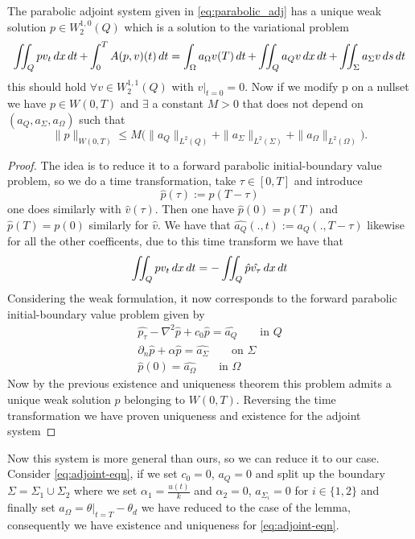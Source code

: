 \begin{lemma}
The parabolic adjoint system given in \eqref{eq:parabolic_adj} has a unique weak solution $p \in W_2^{1,0}(Q)$ which is a solution to the variational problem 
\begin{equation*}
    \iint_Q pv_t \mathop{dx}\mathop{dt} + \int_0^TA(p,v)(t)\mathop{dt} = \int_{\Omega}a_{\Omega}v(T) \mathop{dt} + \iint_Q a_Qv \mathop{dx}\mathop{dt} + \iint_{\Sigma}a_{\Sigma}v \mathop{ds}\mathop{dt}
\end{equation*}
this should hold $\forall v \in W_2^{1,1}(Q)$ with $v|_{t=0} = 0$. Now if we modify p on a nullset we have $p\in W(0,T)$ and $\exists$ a constant $M>0$ that does not depend on $(a_Q,a_{\Sigma}, a_{\Omega})$ such that 
\begin{equation*}
    \|p\|_{W(0,T)} \leq M \bigg (\|a_Q\|_{L^2(Q)} + \|a_{\Sigma}\|_{L^2(\Sigma)} + \|a_{\Omega}\|_{L^2(\Omega)} \bigg ).
\end{equation*}
\end{lemma}

\begin{proof}
The idea is to reduce it to a forward parabolic initial-boundary value problem, so we do a time transformation, take $\tau \in [0,T]$ and introduce 
\begin{equation*}
    \hat{p}(\tau) := p(T-\tau)
\end{equation*}
one does similarly with $\hat{v}(\tau)$. Then one have $\hat{p}(0) = p(T)$ and $\hat{p}(T) = p(0)$ similarly for $\hat{v}$. We have that $\hat{a_Q}(.,t):= a_Q(.,T-\tau)$ likewise for all the other coefficents, due to this time transform we have that
\begin{equation*}
    \iint_Qpv_t \mathop{dx}\mathop{dt} = - \iint_Q \hat{p}\hat{v_{\tau}} \mathop{dx}\mathop{dt}
\end{equation*}
Considering the weak formulation, it now corresponds to the forward parabolic initial-boundary value problem given by 
\begin{align*}
    \hat{p_{\tau}} - \nabla^2 \hat{p} + c_0 \hat{p} = \hat{a_Q} \qquad \text{in } Q \\
    \partial_n \hat{p} + \alpha \hat{p} = \hat{a_{\Sigma}} \qquad \text{on } \Sigma \\
    \hat{p}(0) = \hat{a_{\Omega}} \qquad \text{in } \Omega
\end{align*}
Now by the previous existence and uniqueness theorem this problem admits a unique weak solution $\hat{p}$ belonging to $W(0,T)$. Reversing the time transformation we have proven uniqueness and existence for the adjoint system
\end{proof}
Now this system is more general than ours, so we can reduce it to our case. Consider \eqref{eq:adjoint-eqn}, if we set $c_0 = 0$, $a_Q = 0$ and split up the boundary $\Sigma = \Sigma_1 \cup \Sigma_2$ where we set $\alpha_1 = \frac{u(t)}{k}$ and $\alpha_2 = 0$, $a_{\Sigma_i}=0$ for $i\in \{1,2 \}$ and finally set $a_{\Omega} = \theta|_{t=T}-\theta_d$ we have reduced to the case of the lemma, consequently we have existence and uniqueness for \eqref{eq:adjoint-eqn}.



